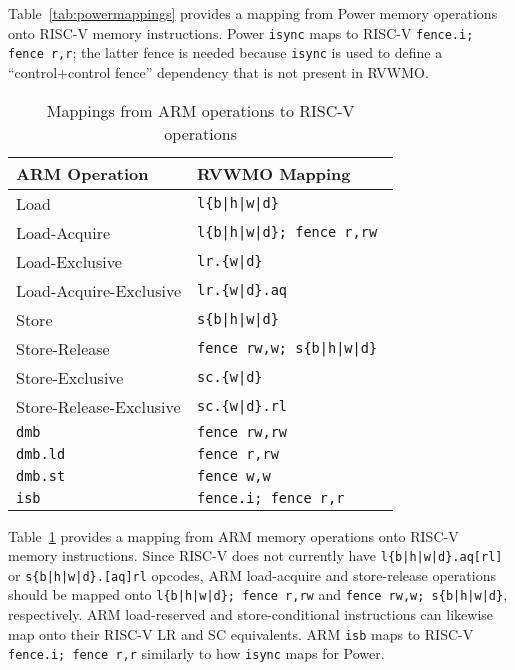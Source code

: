 Table~\ref{tab:powermappings} provides a mapping from Power memory operations onto RISC-V memory instructions.
Power {\tt isync} maps to RISC-V {\tt fence.i; fence r,r}; the latter fence is needed because {\tt isync} is used to define a ``control+control fence'' dependency that is not present in RVWMO.

\begin{table}[h!]
  \centering
  \begin{tabular}{|l|l|}
    \hline
    ARM Operation             & RVWMO Mapping \\
    \hline
    \hline
    Load                      & \tt l\{b|h|w|d\}  \\
    \hline
    Load-Acquire              & \tt l\{b|h|w|d\}; fence r,rw  \\
    \hline
    Load-Exclusive            & \tt lr.\{w|d\}  \\
    \hline
    Load-Acquire-Exclusive    & \tt lr.\{w|d\}.aq \\
    \hline
    Store                     & \tt s\{b|h|w|d\}  \\
    \hline
    Store-Release             & \tt fence rw,w; s\{b|h|w|d\}  \\
    \hline
    Store-Exclusive           & \tt sc.\{w|d\}  \\
    \hline
    Store-Release-Exclusive   & \tt sc.\{w|d\}.rl  \\
    \hline
    \tt dmb                   & \tt fence rw,rw \\
    \hline
    \tt dmb.ld                & \tt fence r,rw \\
    \hline
    \tt dmb.st                & \tt fence w,w \\
    \hline
    \tt isb                   & \tt fence.i; fence r,r \\
    \hline
  \end{tabular}
  \caption{Mappings from ARM operations to RISC-V operations}
  \label{tab:armmappings}
\end{table}

Table~\ref{tab:armmappings} provides a mapping from ARM memory operations onto RISC-V memory instructions.
Since RISC-V does not currently have {\tt l\{b|h|w|d\}.aq[rl]} or  {\tt s\{b|h|w|d\}.[aq]rl} opcodes, ARM load-acquire and store-release operations should be mapped onto {\tt l\{b|h|w|d\}; fence r,rw} and {\tt fence rw,w; s\{b|h|w|d\}}, respectively.
ARM load-reserved and store-conditional instructions can likewise map onto their RISC-V LR and SC equivalents.
ARM {\tt isb} maps to RISC-V {\tt fence.i;~fence~r,r} similarly to how {\tt isync} maps for Power.

